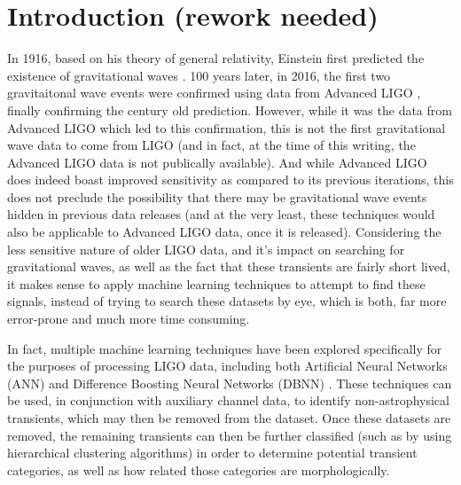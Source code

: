 \documentclass{article}
\begin{document}


\section{Introduction (rework needed)} %
In 1916, based on his theory of general relativity, Einstein first predicted the existence of gravitational waves \cite{Einstein1916}. 100 years later, in 2016, the first two gravitaitonal wave events were confirmed using data from Advanced LIGO \cite{TheLIGOScientificCollaboration2016} \cite{Abbott2016}, finally confirming the century old prediction. However, while it was the data from Advanced LIGO which led to this confirmation, this is not the first gravitational wave data to come from LIGO (and in fact, at the time of this writing, the Advanced LIGO data is not publically available). And while Advanced LIGO does indeed boast improved sensitivity as compared to its previous iterations, this does not preclude the possibility that there may be gravitational wave events hidden in previous data releases (and at the very least, these techniques would also be applicable to Advanced LIGO data, once it is released). Considering the less sensitive nature of older LIGO data, and it's impact on searching for gravitational waves, as well as the fact that these transients are fairly short lived, it makes sense to apply machine learning techniques to attempt to find these signals, instead of trying to search these datasets by eye, which is both, far more error-prone and much more time consuming.

In fact, multiple machine learning techniques have been explored specifically for the purposes of processing LIGO data, including both Artificial Neural Networks (ANN) \cite{Biswas2013} and Difference Boosting Neural Networks (DBNN) \cite{Mukund2016}. These techniques can be used, in conjunction with auxiliary channel data, to identify non-astrophysical transients, which may then be removed from the dataset. Once these datasets are removed, the remaining transients can then be further classified (such as by using hierarchical clustering algorithms) in order to determine potential transient categories, as well as how related those categories are morphologically.
\end{document}
